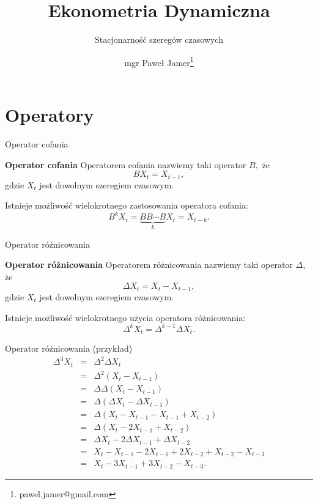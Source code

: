 \documentclass[a4paper, 11pt]{beamer}
\title{Ekonometria Dynamiczna}
\subtitle{Stacjonarność szeregów czasowych}
\author{mgr Paweł Jamer\thanks{pawel.jamer@gmail.com}}
\begin{document}
	\begin{frame}
		\titlepage
	\end{frame}
	
	\section{Operatory}
	
	\begin{frame}{Operator cofania}
		\begin{block}{\textbf{Operator cofania}}
			Operatorem cofania nazwiemy taki operator $B,$ że \[
				B X_{t} = X_{t-1},
			\] gdzie $X_{t}$ jest dowolnym szeregiem czasowym.
		\end{block}
		Istnieje możliwość wielokrotnego zastosowania operatora cofania: \[
			B^{k} X_{t} = \underset{k}{\underbrace{B B \cdots B}} X_{t} = X_{t-k}.
		\]
	\end{frame}
	
	\begin{frame}{Operator różnicowania}
		\begin{block}{\textbf{Operator różnicowania}}
			Operatorem różnicowania nazwiemy taki operator $\Delta,$ że \[
				\Delta X_{t} = X_{t} - X_{t-1},
			\] gdzie $X_{t}$ jest dowolnym szeregiem czasowym.
		\end{block}
		Istnieje możliwość wielokrotnego użycia operatora różnicowania: \[
			\Delta^{k} X_{t} = \Delta^{k-1} \Delta X_{t}.
		\]
	\end{frame}
	
	\begin{frame}{Operator różnicowania (przykład)}
		\begin{eqnarray*}
			\Delta^{3} X_{t} & = & \Delta^{2} \Delta X_{t}\\
				 & = & \Delta^{2} \left( X_{t} - X_{t-1} \right)\\
				 & = & \Delta \Delta \left( X_{t} - X_{t-1} \right)\\
				 & = & \Delta \left( \Delta X_{t} - \Delta X_{t-1} \right)\\
				 & = & \Delta \left( X_{t} - X_{t-1} - X_{t-1} + X_{t-2} \right)\\
				 & = & \Delta \left( X_{t} - 2 X_{t-1} + X_{t-2} \right)\\
				 & = & \Delta X_{t} - 2 \Delta X_{t-1} + \Delta X_{t-2}\\
				 & = & X_{t} - X_{t-1} - 2 X_{t-1} + 2 X_{t-2} + X_{t-2} - X_{t-3}\\
				 & = & X_{t} - 3 X_{t-1} + 3 X_{t-2} - X_{t-3}.
		\end{eqnarray*}
	\end{frame}
	
\end{document}
